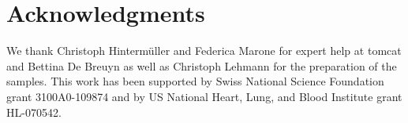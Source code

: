 \section{Acknowledgments}
We thank Christoph Hinterm\"uller and Federica Marone for expert help at \ac{tomcat} and Bettina De Breuyn as well as Christoph Lehmann for the preparation of the samples. This work has been supported by Swiss National Science Foundation grant 3100A0-109874 and by US National Heart, Lung, and Blood Institute grant HL-070542.
%
%